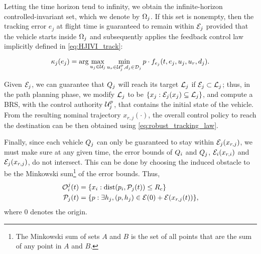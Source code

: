 Letting the time horizon tend to infinity, we obtain the infinite-horizon controlled-invariant set, which we denote by $\Omega_j$. If this set is nonempty, then the tracking error $e_j$ at flight time is guaranteed to remain within $\mathcal{E}_j$ provided that the vehicle starts inside $\Omega_j$ and subsequently applies the feedback control law implicitly defined in \eqref{eq:HJIVI_track}:

\begin{equation}
\label{eq:robust_tracking_law}
\tracklaw_j(e_j) = \arg\max_{u_j \in \cset_j} \min_{u_r \in\cset^p_j, d_j \in \dset_j} p \cdot f_{e_j}(t,e_j,u_j,u_r,d_j).
\end{equation}

Given $\mathcal{E}_j$, we can guarantee that $Q_{j}$ will reach its target $\mathcal{L}_j$ if $\mathcal{E}_j \subset \mathcal{L}_j$; thus, in the path planning phase, we modify $\mathcal{L}_j$ to be $\{x_j: \mathcal{E}_j(x_j) \subseteq \mathcal{L}_j\}$, and compute a BRS, with the control authority $\mathcal{U}^p_j$, that contains the initial state of the vehicle. From the resulting nominal trajectory $x_{r,j}(\cdot)$, the overall control policy to reach the destination can be then obtained using \eqref{eq:robust_tracking_law}.

Finally, since each vehicle $Q_{j}$ can only be guaranteed to stay within $\mathcal{E}_j(x_{r,j})$, we must make sure at any given time, the error bounds of $Q_{i}$ and $Q_{j}$, $\mathcal{E}_i(x_{r,i})$ and $\mathcal{E}_j(x_{r,j})$, do not intersect. This can be done by choosing the induced obstacle to be the Minkowski sum\footnote{The Minkowski sum of sets $A$ and $B$ is the set of all points that are the sum of any point in $A$ and $B$.} of the error bounds. Thus,
\vspace{-0.3em}
\begin{equation}
\begin{aligned}
\mathcal{O}_i^j(t) &= \{x_i: \text{dist}(p_i, \mathcal{P}_j(t)) \le R_c \} \\
\mathcal{P}_j(t) &= \{p: \exists h_j, (p, h_j) \in \mathcal{E}(0) + \mathcal{E}(x_{r,j}(t)) \},
\end{aligned}
\end{equation}
\noindent where $0$ denotes the origin. 
